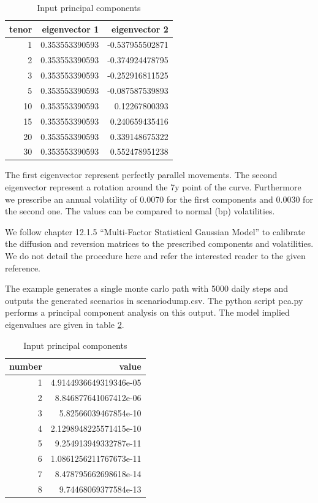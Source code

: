 \begin{table}[hbt]
\begin{center}
\begin{tabular}{r|r|r}
tenor & eigenvector 1  & eigenvector 2   \\
\hline      
1     & 0.353553390593 & -0.537955502871 \\
2     & 0.353553390593 & -0.374924478795 \\
3     & 0.353553390593 & -0.252916811525 \\
5     & 0.353553390593 & -0.087587539893 \\
10    & 0.353553390593 & 0.12267800393   \\
15    & 0.353553390593 & 0.240659435416  \\
20    & 0.353553390593 & 0.339148675322  \\
30    & 0.353553390593 & 0.552478951238
\end{tabular}
\caption{Input principal components}
\label{tab:ex37_1}
\end{center}
\end{table}

The first eigenvector represent perfectly parallel movements. The second eigenvector represent a rotation around the 7y
point of the curve. Furthermore we prescribe an annual volatility of 0.0070 for the first components and 0.0030 for the
second one. The values can be compared to normal (bp) volatilities.

We follow \cite{Andersen_Piterbarg_2010} chapter 12.1.5 ``Multi-Factor Statistical Gaussian Model'' to calibrate the
diffusion and reversion matrices to the prescribed components and volatilities. We do not detail the procedure here and
refer the interested reader to the given reference.

The example generates a single monte carlo path with 5000 daily steps and outputs the generated scenarios in
scenariodump.csv. The python script pca.py performs a principal component analysis on this output. The model implied
eigenvalues are given in table \ref{tab:ex37_2}.

\begin{table}[hbt]
\begin{center}
\begin{tabular}{r|r}
number & value                  \\
\hline      
1      & 4.9144936649319346e-05 \\
2      & 8.846877641067412e-06  \\
3      & 5.82566039467854e-10   \\
4      & 2.1298948225571415e-10 \\
5      & 9.254913949332787e-11  \\
6      & 1.0861256211767673e-11 \\
7      & 8.478795662698618e-14  \\
8      & 9.74468069377584e-13   \\
\end{tabular}
\caption{Input principal components}
\label{tab:ex37_2}
\end{center}
\end{table}

